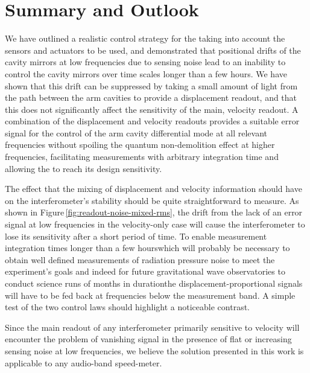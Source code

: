 \section{\label{sec:ssm-control-summary}Summary and Outlook}
We have outlined a realistic control strategy for the \SSMEXPT{} taking into account the sensors and actuators to be used, and demonstrated that positional drifts of the cavity mirrors at low frequencies due to sensing noise lead to an inability to control the cavity mirrors over time scales longer than a few hours. We have shown that this drift can be suppressed by taking a small amount of light from the path between the arm cavities to provide a displacement readout, and that this does not significantly affect the sensitivity of the main, velocity readout. A combination of the displacement and velocity readouts provides a suitable error signal for the control of the arm cavity differential mode at all relevant frequencies without spoiling the quantum non-demolition effect at higher frequencies, facilitating measurements with arbitrary integration time and allowing the \SSM{} to reach its design sensitivity.

The effect that the mixing of displacement and velocity information should have on the interferometer's stability should be quite straightforward to measure. As shown in Figure\,\ref{fig:readout-noise-mixed-rms}, the drift from the lack of an error signal at low frequencies in the velocity-only case will cause the interferometer to lose its sensitivity after a short period of time. To enable measurement integration times longer than a few hours\textemdash which will probably be necessary to obtain well defined measurements of radiation pressure noise to meet the experiment's goals and indeed for future gravitational wave observatories to conduct science runs of months in duration\textemdash the displacement-proportional signals will have to be fed back at frequencies below the measurement band. A simple test of the two control laws should highlight a noticeable contrast.

Since the main readout of any interferometer primarily sensitive to velocity will encounter the problem of vanishing signal in the presence of flat or increasing sensing noise at low frequencies, we believe the solution presented in this work is applicable to any audio-band speed-meter.